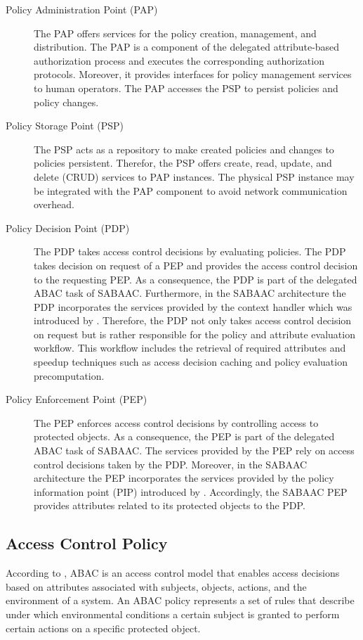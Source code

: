 \begin{description}
    \item[Policy Administration Point (PAP)] The PAP offers services for the policy creation, management, and distribution.
    The PAP is a component of the delegated attribute-based authorization process and executes the corresponding authorization protocols.
    Moreover, it provides interfaces for policy management services to human operators.
    The PAP accesses the PSP to persist policies and policy changes.
    \item[Policy Storage Point (PSP)] The PSP acts as a repository to make created policies and changes to policies persistent.
    Therefor, the PSP offers create, read, update, and delete (CRUD) services to PAP instances.
    The physical PSP instance may be integrated with the PAP component to avoid network communication overhead.
    \item[Policy Decision Point (PDP)] The PDP takes access control decisions by evaluating policies.
    The PDP takes decision on request of a PEP and provides the access control decision to the requesting PEP.
    As a consequence, the PDP is part of the delegated ABAC task of SABAAC.
    Furthermore, in the SABAAC architecture the PDP incorporates the services provided by the context handler which was introduced by \citeauthor{Hu2014} \cite{Hu2014}.
    Therefore, the PDP not only takes access control decision on request but is rather responsible for the policy and attribute evaluation workflow.
    This workflow includes the retrieval of required attributes and speedup techniques such as access decision caching and policy evaluation precomputation.
    \item[Policy Enforcement Point (PEP)] The PEP enforces access control decisions by controlling access to protected objects.
    As a consequence, the PEP is part of the delegated ABAC task of SABAAC.
    The services provided by the PEP rely on access control decisions taken by the PDP.
    Moreover, in the SABAAC architecture the PEP incorporates the services provided by the policy information point (PIP) introduced by \citeauthor{Hu2014} \cite{Hu2014}.
    Accordingly, the SABAAC PEP provides attributes related to its protected objects to the PDP.
\end{description}

\subsection{Access Control Policy}
\label{sec:approach:sabaac:policy}
According to \citeauthor{Hu2014} \cite{Hu2014}, ABAC is an access control model that enables access decisions based on attributes associated with subjects, objects, actions, and the environment of a system.
An ABAC policy represents a set of rules that describe under which environmental conditions a certain subject is granted to perform certain actions on a specific protected object.

